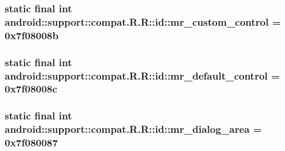 \hypertarget{classandroid_1_1support_1_1compat_1_1_r_1_1id_8bb3d126b8d2a7fc8ed1e3e67044651c}{
\subsubsection[{mr\_\-custom\_\-control}]{\setlength{\rightskip}{0pt plus 5cm}static final int android::support::compat.R.R::id::mr\_\-custom\_\-control = 0x7f08008b}}
\label{classandroid_1_1support_1_1compat_1_1_r_1_1id_8bb3d126b8d2a7fc8ed1e3e67044651c}


\hypertarget{classandroid_1_1support_1_1compat_1_1_r_1_1id_b6a65b65874101043f42e1fd61c7495b}{
\subsubsection[{mr\_\-default\_\-control}]{\setlength{\rightskip}{0pt plus 5cm}static final int android::support::compat.R.R::id::mr\_\-default\_\-control = 0x7f08008c}}
\label{classandroid_1_1support_1_1compat_1_1_r_1_1id_b6a65b65874101043f42e1fd61c7495b}


\hypertarget{classandroid_1_1support_1_1compat_1_1_r_1_1id_5a5426e87089b4fcfd3078777a23ef7d}{
\subsubsection[{mr\_\-dialog\_\-area}]{\setlength{\rightskip}{0pt plus 5cm}static final int android::support::compat.R.R::id::mr\_\-dialog\_\-area = 0x7f080087}}
\label{classandroid_1_1support_1_1compat_1_1_r_1_1id_5a5426e87089b4fcfd3078777a23ef7d}


